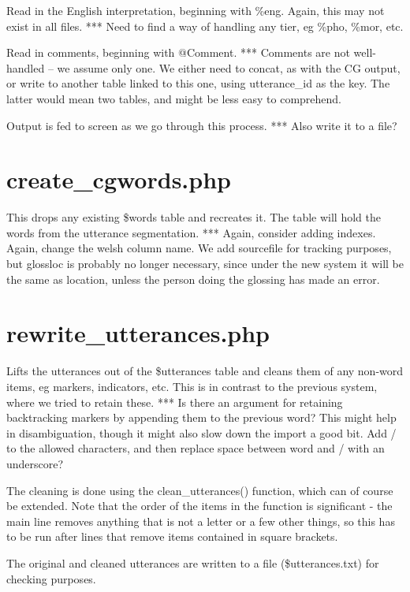\documentclass[a4paper,10pt]{article}
\begin{document}
Read in the English interpretation, beginning with \%eng.  Again, this may not exist in all files.
*** Need to find a way of handling any tier, eg \%pho, \%mor, etc.   

Read in comments, beginning with @Comment.  
*** Comments are not well-handled -- we assume only one.  We either need to concat, as with the CG output, or write to another table linked to this one, using utterance\_id as the key.  The latter would mean two tables, and might be less easy to comprehend.

Output is fed to screen as we go through this process.
*** Also write it to a file?


\section{create\_cgwords.php}

This drops any existing \$words table and recreates it.  The table will hold the words from the utterance segmentation.
*** Again, consider adding indexes.  Again, change the welsh column name.  We add sourcefile for tracking purposes, but glossloc is probably no longer necessary, since under the new system it will be the same as location, unless the person doing the glossing has made an error.


\section{rewrite\_utterances.php}

Lifts the utterances out of the \$utterances table and cleans them of any non-word items, eg markers, indicators, etc.  This is in contrast to the previous system, where we tried to retain these.
*** Is there an argument for retaining backtracking markers by appending them to the previous word?  This might help in disambiguation, though it might also slow down the import a good bit.  Add / to the allowed characters, and then replace space between word and / with an underscore?

The cleaning is done using the clean\_utterances() function, which can of course be extended.  Note that the order of the items in the function is significant - the main line removes anything that is not a letter or a few other things, so this has to be run after lines that remove items contained in square brackets.

The original and cleaned utterances are written to a file (\$utterances.txt) for checking purposes.
\end{document}
